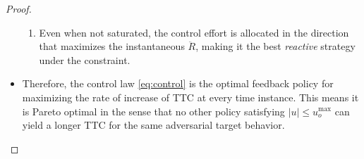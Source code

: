\documentclass[10pt]{article}
\theoremstyle{plain}
\begin{document}
\begin{proof}
\begin{itemize}
\begin{enumerate}
            \item Even when not saturated, the control effort is allocated in the direction that maximizes the instantaneous $\ddot{R}$, making it the best \textit{reactive} strategy under the constraint.
        \end{enumerate}
        \item Therefore, the control law \eqref{eq:control} is the optimal feedback policy for maximizing the rate of increase of TTC at every time instance. This means it is Pareto optimal in the sense that no other policy satisfying $|u| \leq u_o^{\max}$ can yield a longer TTC for the same adversarial target behavior.
    \end{itemize}
\end{proof}
\end{document}

